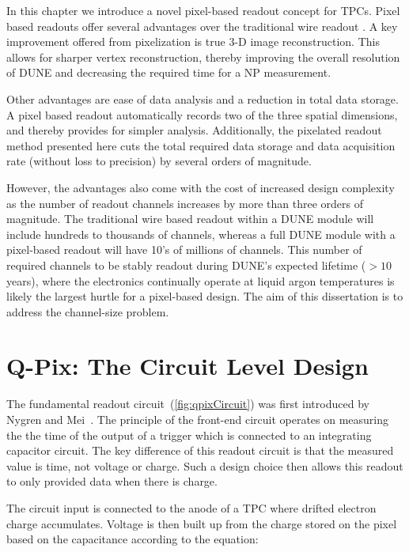 In this chapter we introduce a novel pixel-based readout concept for TPCs.
Pixel based readouts offer several advantages over the traditional wire readout \citep{lartpc_recon_problems_joshi_2015}.
A key improvement offered from pixelization is true 3-D image reconstruction.
This allows for sharper vertex reconstruction, thereby improving the overall resolution of DUNE and decreasing the required time for a NP measurement.

Other advantages are ease of data analysis and a reduction in total data storage.
A pixel based readout automatically records two of the three spatial dimensions, and thereby provides for simpler analysis.
Additionally, the pixelated readout method presented here cuts the total required data storage and data acquisition rate (without loss to precision) by several orders of magnitude.

However, the advantages also come with the cost of increased design complexity as the number of readout channels increases by more than three orders of magnitude. 
The traditional wire based readout within a DUNE module will include hundreds to thousands of channels, whereas a full DUNE module with a pixel-based readout will have 10's of millions of channels.
This number of required channels to be stably readout during DUNE's expected lifetime ($> 10$ years), where the electronics continually operate at liquid argon temperatures is likely the largest hurtle for a pixel-based design.
The aim of this dissertation is to address the channel-size problem.

\section{Q-Pix: The Circuit Level Design}

The fundamental readout circuit~(\ref{fig:qpixCircuit}) was first introduced by Nygren and Mei~\citep{qpix:nygren:mei}.
The principle of the front-end circuit operates on measuring the the time of the output of a trigger which is connected to an integrating capacitor circuit.
The key difference of this readout circuit is that the measured value is time, not voltage or charge.
Such a design choice then allows this readout to only provided data when there is charge.

The circuit input is connected to the anode of a TPC where drifted electron charge accumulates.
Voltage is then built up from the charge stored on the pixel based on the capacitance according to the equation:


